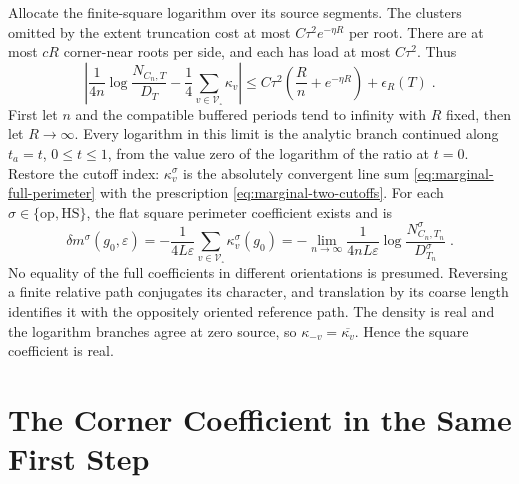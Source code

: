 \documentclass[11pt]{article}
\begin{document}
Allocate the finite-square logarithm over its source segments. The clusters omitted by the extent truncation cost at most $C\tau^2e^{-\eta R}$ per root. There are at most $cR$ corner-near roots per side, and each has load at most $C\tau^2$. Thus
\begin{equation}\label{eq:marginal-buffered-density}
    \left|\frac{1}{4n}\log\frac{N_{C_n,T}}{D_T}
        -\frac{1}{4}\sum_{v\in \mathscr V_\square}\kappa_v\right|
        \leq C\tau^2\left(\frac{R}{n}+e^{-\eta R}\right)
            +\epsilon_R(T)\;.
\end{equation}
First let $n$ and the compatible buffered periods tend to infinity with $R$ fixed, then let $R\to\infty$. Every logarithm in this limit is the analytic branch continued along $t_a=t$, $0\leq t\leq 1$, from the value zero of the logarithm of the ratio at $t=0$. Restore the cutoff index: $\kappa_v^{\sigma}$ is the absolutely convergent line sum \eqref{eq:marginal-full-perimeter} with the prescription \eqref{eq:marginal-two-cutoffs}. For each $\sigma\in \{\mathrm{op},\mathrm{HS}\}$, the flat square perimeter coefficient exists and is
\begin{equation}\label{eq:marginal-square-mass}
    \boxed{\displaystyle
        \delta m^{\sigma}(g_0,\varepsilon)
            =-\frac{1}{4L\varepsilon}
                \sum_{v\in \mathscr V_\square}\kappa_v^{\sigma}(g_0)
            =-\lim_{n\to\infty}
                \frac{1}{4nL\varepsilon}
                    \log\frac{N_{C_n,T_n}^{\sigma}}{D_{T_n}^{\sigma}}}
        \;.
\end{equation}
No equality of the full coefficients in different orientations is presumed. Reversing a finite relative path conjugates its character, and translation by its coarse length identifies it with the oppositely oriented reference path. The density is real and the logarithm branches agree at zero source, so $\kappa_{-v}=\overline{\kappa_v}$. Hence the square coefficient is real.

\section{The Corner Coefficient in the Same First Step}
\label{sec:marginal-corner}
\end{document}
